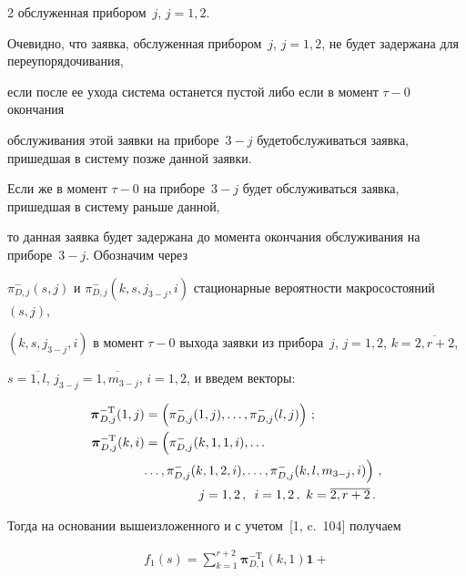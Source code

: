\begin{multicols}{2}
обслуженная прибором~$j$, $j=1,2$.



Очевидно, что заявка, обслуженная прибором~$j$, $j=1,2$, не будет задержана для переупорядочивания, 

если после ее ухода система останется пус\-той либо если в момент $\tau -0$ окончания 

обслуживания этой заявки на приборе~$3-j$ будет\linebreak обслуживаться заявка, пришедшая в систему позже данной заявки. 

Если же в момент $\tau -0$ на приборе~$3-j$ будет обслуживаться заявка, пришедшая в систему  раньше данной, 

то данная заявка будет задержана до момента окончания обслуживания на приборе~$3-j$. Обозначим через 

$\pi_{D,j}^{-}(s,j)$ и $\pi_{D,j}^{-}(k,s,j_{3-j},i)$ стационарные вероятности макросостояний $(s,j)$, 

$(k,s,j_{3-j},i)$ в момент $\tau -0$ выхода заявки из прибора~$j$, $j=1,2$, $k=\overline{2,r+2}$, 

$s=\overline{1,l}$, $j_{3-j}=\overline{1,m_{3-j}}$, $i=1,2$, и введем векторы:

\begin{align*}

\boldsymbol{\pi}_{D,j}^{-\mathrm{T}}(1,j)&=\left(\pi_{D,j}^{-}(1,j),\ldots, \pi_{D,j}^{-}(l,j)\right)\,;

\\

\boldsymbol{\pi}_{D,j}^{-\mathrm{T}}(k,i)&=\left(\pi_{D,j}^{-}(k,1,1,i),\ldots \right.\\

&\!\!\left.\ldots,\pi_{D,j}^{-}(k,1,2,i),\ldots, \pi_{D,j}^{-}(k,l,m_{3-j},i)\right)\,,\\

&\hspace*{15mm}j=1,2\,,\enskip  i=1,2\,,\,\, k=\overline{2,r+2}\,.

\end{align*}



Тогда на основании вышеизложенного и с учетом~[1, c.~104] получаем

\begin{multline}

\label{eq:16}

f_1(s)=\sum\limits_{k=1}^{r+2}\boldsymbol{\pi}_{D,1}^{-\mathrm{T}}(k,1) \boldsymbol{1}+{}\\


\end{multline}
\end{multicols}
